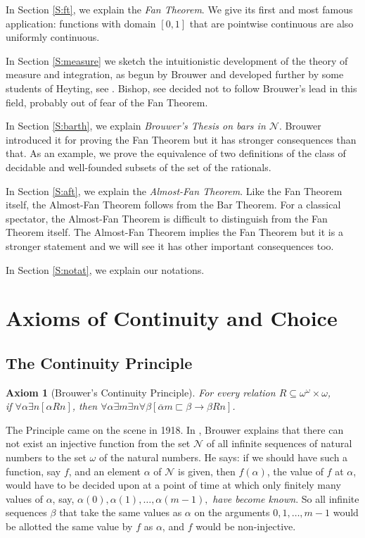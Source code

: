 \documentclass[a4paper]{amsart}
\theoremstyle{plain}
\newtheorem{axiom}{Axiom}
\begin{document}
In Section \ref{S:ft}, we explain the {\it Fan Theorem}. We give its first and most famous application: functions with domain $[0,1]$ that are pointwise continuous are also uniformly continuous.

In Section \ref{S:measure} we sketch the intuitionistic development of the theory of measure and integration, as begun by Brouwer and developed further by some students of Heyting, see \cite[Chapter VI]{heyting56}. Bishop, see \cite[Chapter 6]{bishopbridges85} decided not to follow  Brouwer's lead in this field, probably out of fear of the Fan Theorem.

In Section \ref{S:barth}, we explain {\it Brouwer's Thesis on bars in $\mathcal{N}$}. Brouwer introduced it for proving the Fan Theorem but it has stronger consequences than that. As an example, we prove the equivalence of two definitions of the class of decidable and well-founded subsets of the set of the rationals.  

In Section \ref{S:aft}, we explain the {\it Almost-Fan Theorem}. Like the Fan Theorem itself, the Almost-Fan Theorem follows from the Bar Theorem. For a classical spectator, the Almost-Fan Theorem is difficult to distinguish from the Fan Theorem itself. The Almost-Fan Theorem implies the Fan Theorem but it is a stronger statement and  we will see it has other important consequences too. 

In Section \ref{S:notat}, we explain our notations. 

\section{Axioms of  Continuity and Choice}\label{S:cp}

\subsection{The Continuity Principle}\begin{axiom}[Brouwer's Continuity Principle]\label{ax:bcp} For every relation $R\subseteq \omega^\omega\times\omega$, \\if $\forall \alpha \exists n[\alpha Rn]$, then $\forall \alpha\exists m\exists n \forall \beta[\overline\alpha m \sqsubset \beta\rightarrow \beta Rn]$. \end{axiom}

The Principle came on the scene in 1918. In \cite[p. 13]{brouwer18}, Brouwer explains  that there can not exist an injective function from the set $\mathcal{N}$ of all infinite sequences of natural numbers  to the set $\omega$ of the natural numbers. He  says: if we should have such a function, say $f$, and an element $\alpha$ of $\mathcal{N}$ is given, then $f(\alpha)$, the value of $f$ at $\alpha$, would have to be decided upon at a point of time at which  only finitely many values of $\alpha$, say, $ \alpha(0), \alpha(1), \ldots, \alpha(m-1),$ {\it have become known}. So all infinite sequences $\beta$ that take the same values as $\alpha$ on the arguments $0,1, \ldots, m-1$ would be allotted the same value by $f$ as $\alpha$, and $f$ would be non-injective. 
\end{document}
